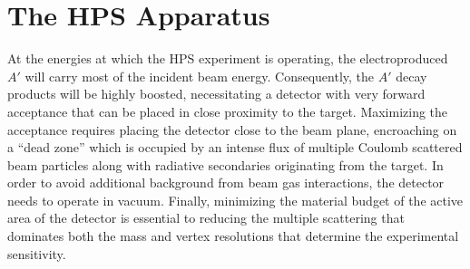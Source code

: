 
\chapter{The HPS Apparatus}


At the energies at which the HPS experiment is operating, the 
electroproduced $A'$ will carry most of the incident beam energy. Consequently,
the $A'$ decay products will be highly boosted, necessitating a detector with very
forward acceptance that can be placed in close proximity to the target.
Maximizing the acceptance requires placing the detector close to the beam plane,
encroaching on a ``dead zone'' which is occupied by an intense flux of multiple
Coulomb scattered beam particles along with radiative secondaries originating
from the target.  In order to avoid additional background from beam gas
interactions, the detector needs to operate in vacuum. Finally, minimizing the
material budget of the active area of the detector is essential to reducing the
multiple scattering that dominates both the mass and vertex resolutions that
determine the experimental sensitivity.

